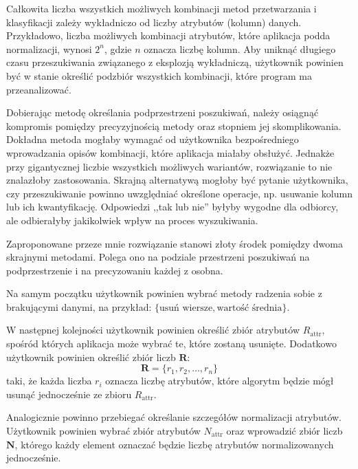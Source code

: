 \documentclass[../thesis.tex]{subfiles}
\begin{document}
Całkowita liczba wszystkich możliwych kombinacji metod przetwarzania i klasyfikacji zależy wykładniczo od liczby atrybutów (kolumn) danych. Przykładowo, liczba możliwych kombinacji atrybutów, które aplikacja podda normalizacji, wynosi $2^{n}$, gdzie $n$ oznacza liczbę kolumn. Aby uniknąć długiego czasu przeszukiwania związanego z eksplozją wykładniczą, użytkownik powinien być w stanie określić podzbiór wszystkich kombinacji, które program ma przeanalizować.

Dobierając metodę określania podprzestrzeni poszukiwań, należy osiągnąć kompromis pomiędzy precyzyjnością metody oraz stopniem jej skomplikowania. Dokładna metoda mogłaby wymagać od użytkownika bezpośredniego wprowadzania opisów kombinacji, które aplikacja miałaby obsłużyć. Jednakże przy gigantycznej liczbie wszystkich możliwych wariantów, rozwiązanie to nie znalazłoby zastosowania. Skrajną alternatywą mogłoby być pytanie użytkownika, czy przeszukiwanie powinno uwzględniać określone operacje, np. usuwanie kolumn lub ich kwantyfikację. Odpowiedzi ,,tak lub nie'' byłyby wygodne dla odbiorcy, ale odbierałyby jakikolwiek wpływ na proces wyszukiwania.

Zaproponowane przeze mnie rozwiązanie stanowi złoty środek pomiędzy dwoma skrajnymi metodami. Polega ono na podziale przestrzeni poszukiwań na podprzestrzenie i na precyzowaniu każdej z osobna.

Na samym początku użytkownik powinien wybrać metody radzenia sobie z brakującymi danymi, na przykład: $\{\textrm{usuń wiersze}, \textrm{wartość średnia}\}$.

W następnej kolejności użytkownik powinien określić zbiór atrybutów $R_\textrm{attr}$, spośród których aplikacja może wybrać te, które zostaną usunięte. Dodatkowo użytkownik powinien określić zbiór liczb $\textbf{R}$:
\begin{displaymath}
\textbf{R} = \{r_1, r_2, \ldots, r_n\}
\end{displaymath}
taki, że każda liczba $r_i$ oznacza liczbę atrybutów, które algorytm będzie mógł usunąć jednocześnie ze zbioru $R_\textrm{attr}$.

Analogicznie powinno przebiegać określanie szczegółów normalizacji atrybutów. Użytkownik powinien wybrać zbiór atrybutów $N_\textrm{attr}$ oraz wprowadzić zbiór liczb $\textbf{N}$, którego każdy element oznaczać będzie liczbę atrybutów normalizowanych jednocześnie.
\end{document}
